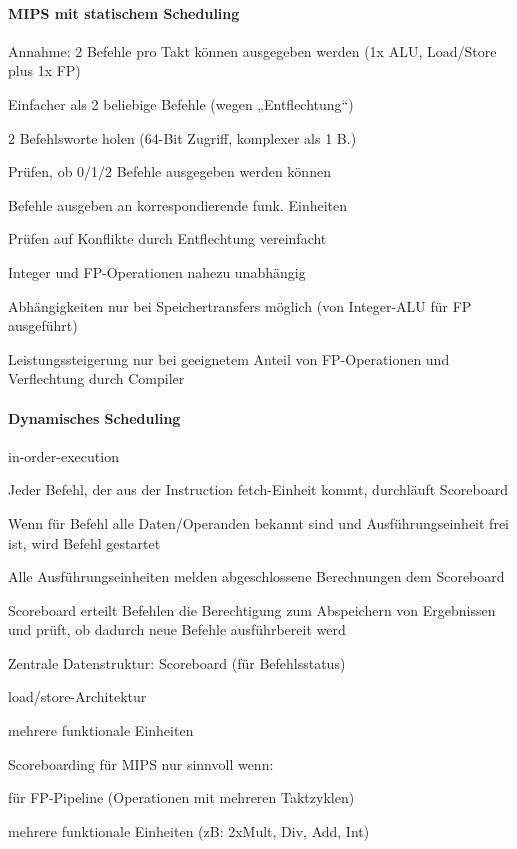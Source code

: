 \documentclass[10pt,landscape]{article}
\begin{document}
\begin{multicols}{3}
  \paragraph{MIPS mit statischem Scheduling}
  \begin{itemize*}
    \item Annahme: 2 Befehle pro Takt können ausgegeben werden (1x ALU, Load/Store plus 1x FP)
    \item Einfacher als 2 beliebige Befehle (wegen „Entflechtung“)
    \item 2 Befehlsworte holen (64-Bit Zugriff, komplexer als 1 B.)
    \item Prüfen, ob 0/1/2 Befehle ausgegeben werden können
    \item Befehle ausgeben an korrespondierende funk. Einheiten
    \item Prüfen auf Konflikte durch Entflechtung vereinfacht
    \item Integer und FP-Operationen nahezu unabhängig
    \item Abhängigkeiten nur bei Speichertransfers möglich (von Integer-ALU für FP ausgeführt)
    \item Leistungssteigerung nur bei geeignetem Anteil von FP-Operationen und Verflechtung durch Compiler
  \end{itemize*}
  
  \paragraph{Dynamisches Scheduling} in-order-execution
  \begin{itemize*}
    \item Jeder Befehl, der aus der Instruction fetch-Einheit kommt, durchläuft Scoreboard
    \item Wenn für Befehl alle Daten/Operanden bekannt sind und Ausführungseinheit frei ist, wird Befehl gestartet
    \item Alle Ausführungseinheiten melden abgeschlossene Berechnungen dem Scoreboard
    \item Scoreboard erteilt Befehlen die Berechtigung zum Abspeichern von Ergebnissen und prüft, ob dadurch neue Befehle ausführbereit werd
    \item Zentrale Datenstruktur: Scoreboard (für Befehlsstatus)
    \item load/store-Architektur
    \item mehrere funktionale Einheiten
    \item Scoreboarding für MIPS nur sinnvoll wenn:
    \item für FP-Pipeline (Operationen mit mehreren Taktzyklen)
    \item mehrere funktionale Einheiten (zB: 2xMult, Div, Add, Int)
  \end{itemize*}
  

\end{multicols}
\end{document}
